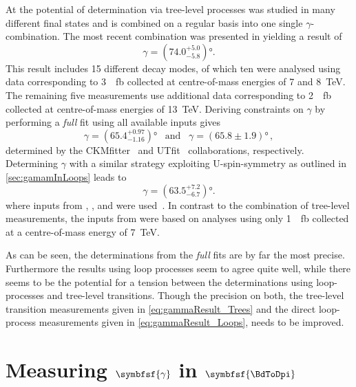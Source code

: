 At \lhcb the potential of determination via tree-level processes was studied in many different final states and is combined on a regular basis into one single $\gamma$-combination.
The most recent combination was presented in \cite{GammCombo} yielding a result of
\begin{equation}
\gamma=\left(74.0^{+5.0}_{-5.8}\right)\!\si{\degree}.\label{eq:gammaResult_Trees}
\end{equation}
This result includes \num{15} different decay modes, of which ten were analysed using data corresponding to \SI{3}{\per\femto\barn} collected at centre-of-mass energies of \num{7} and \SI{8}{\tera\electronvolt}.
The remaining five measurements use additional data corresponding to \SI{2}{\per\femto\barn} collected at centre-of-mass energies of \SI{13}{\tera\electronvolt}.
Deriving constraints on $\gamma$ by performing a \emph{full} fit using all available inputs gives
\begin{equation}
\gamma=\left(65.4^{+0.97}_{-1.16}\right)\!\si{\degree}\,\,\,\,\,\text{and}\,\,\,\,\,\gamma=\left(65.8\pm1.9\right)\!\si{\degree}\,,
\end{equation}
determined by the CKMfitter~\cite{CKMfitter2015} and UTfit~\cite{UTfit-UT} collaborations, respectively.
Determining $\gamma$ with a similar strategy exploiting U-spin-symmetry as outlined in \cref{sec:gamamInLoops} leads to
\begin{equation}
\gamma=\left(63.5^{+7.2}_{-6.7}\right)\!\si{\degree}.\label{eq:gammaResult_Loops}
\end{equation}
where inputs from \babar, \belle, \cdf and \lhcb were used~\cite{Aaij:2014xba}. In contrast to the combination of tree-level measurements, the inputs from \lhcb were based on analyses using only \SI{1}{\per\femto\barn} collected at a centre-of-mass energy of \SI{7}{\tera\electronvolt}.

As can be seen, the determinations from the \emph{full} fits are by far the most precise.
Furthermore the results using loop processes seem to agree quite well, while there seems to be the potential for a tension between the determinations using loop-processes and tree-level transitions.
Though the precision on both, the tree-level transition measurements given in \cref{eq:gammaResult_Trees} and the direct loop-process measurements given in \cref{eq:gammaResult_Loops}, needs to be improved.

\section[head={Measuring $\gamma$ in $\BdToDpi$},tocentry={Measuring $\gamma$ in $\BdToDpi$}]{Measuring $\symbfsf{\gamma}$ in $\symbfsf{\BdToDpi}$}
\label{sec:GammaInBd2Dpi}


